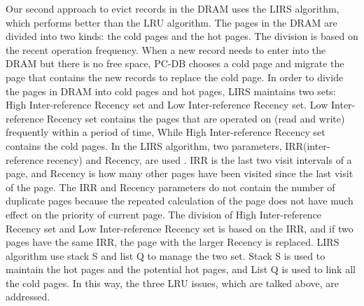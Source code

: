 Our second approach to evict records in the DRAM uses the LIRS algorithm, which performs better than the LRU algorithm. The pages in the DRAM are divided into two kinds: the cold pages and the hot pages. The division is based on the recent operation frequency. When a new record needs to enter into the DRAM but there is no free space, PC-DB chooses a cold page and migrate the page that contains the new records to replace the cold page. In order to divide the pages in DRAM into cold pages and hot pages, LIRS maintains two sets: High Inter-reference Recency set and Low Inter-reference Recency set. Low Inter-reference Recency set contains the pages that are operated on (read and write) frequently within a period of time, While High Inter-reference Recency set contains the cold pages. In the LIRS algorithm, two parameters, IRR(inter-reference recency) and Recency, are used . IRR is the last two visit intervals of a page, and Recency is how many other pages have been visited since the last visit of the page. The IRR and Recency parameters do not contain the number of duplicate pages because the repeated calculation of the page does not have much effect on the priority of current page. The division of High Inter-reference Recency set and Low Inter-reference Recency set is based on the IRR, and if two pages have the same IRR, the page with the larger Recency is replaced. LIRS algorithm use stack S and list Q to manage the two set. Stack S is used to maintain the hot pages and the potential hot pages, and List Q is used to link all the cold pages. In this way, the three LRU issues, which are talked above, are addressed. 
